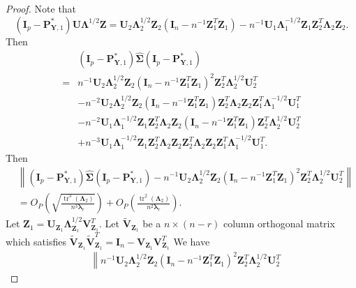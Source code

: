 \documentclass[12pt]{article} %
\DeclareMathOperator{\mytr}{tr}
\newcommand{\bZ}{\mathbf{Z}}
\newcommand{\bP}{\mathbf{P}}
\newcommand{\bY}{\mathbf{Y}}
\newcommand{\bI}{\mathbf{I}}
\newcommand{\bU}{\mathbf{U}}
\newcommand{\bV}{\mathbf{V}}
\newcommand{\bfsym}[1]{\ensuremath{\boldsymbol{#1}}}
\def\blambda {\bfsym {\lambda}}
\def\bLambda {\bfsym {\Lambda}}
\def\bSigma {\bfsym {\Sigma}}
\theoremstyle{definition}
\begin{document}
\begin{appendices}
\begin{proof}
    Note that 
    \begin{equation*}
        (\bI_p-\bP^*_{\bY,1}) \bU \bLambda^{1/2} \bZ
        = \bU_2 \bLambda_2^{1/2} \bZ_2 (\bI_n -n^{-1} \bZ_1^T \bZ_1)-n^{-1} \bU_1 \bLambda_1^{-1/2} \bZ_1 \bZ_2^T \bLambda_2 \bZ_2.
    \end{equation*}
    Then
    \begin{equation*}
        \begin{split}
             &(\bI_p-\bP^*_{\bY,1})\hat{\bSigma}(\bI_p-\bP^*_{\bY,1})
             \\
             =
             &n^{-1}\bU_2 \bLambda_2^{1/2} \bZ_2 (\bI_n -n^{-1} \bZ_1^T \bZ_1)^{2} \bZ_2^T \bLambda_2^{1/2} \bU_2^T
             \\
             &-
             n^{-2} \bU_2 \bLambda_2^{1/2} \bZ_2 (\bI_n -n^{-1} \bZ_1^T \bZ_1)
             \bZ_2^T \bLambda_2 \bZ_2 \bZ_1^T \bLambda_1^{-1/2} \bU_1^T
             \\
             &-
             n^{-2} \bU_1 \bLambda_1^{-1/2} \bZ_1 \bZ_2^T \bLambda_2 \bZ_2(\bI_n -n^{-1} \bZ_1^T \bZ_1) \bZ_2^T \bLambda_2^{1/2} \bU_2^T
             \\
             &+
             n^{-3}
\bU_1 \bLambda_1^{-1/2} \bZ_1 \bZ_2^T \bLambda_2 \bZ_2 \bZ_2^T \bLambda_2 \bZ_2 \bZ_1^T \bLambda_1^{-1/2} \bU_1^T
.
        \end{split}
    \end{equation*}
    Then
    \begin{equation*}
        \begin{split}
             &\left\|
             (\bI_p-\bP^*_{\bY,1})\hat{\bSigma}(\bI_p-\bP^*_{\bY,1})
             -n^{-1}\bU_2 \bLambda_2^{1/2} \bZ_2 (\bI_n -n^{-1} \bZ_1^T \bZ_1)^{2} \bZ_2^T \bLambda_2^{1/2} \bU_2^T
             \right\|
             \\
             &=O_P\left(\sqrt{\frac{\mytr^{3}(\bLambda_2)}{n^{3}\blambda_r}}\right)
             +O_P\left( \frac{\mytr^2 (\bLambda_2)}{n^2\blambda_r}\right).
        \end{split}
    \end{equation*}
    Let $\bZ_1=\bU_{\bZ_1}\bLambda_{\bZ_1}^{1/2}\bV_{\bZ_1}^T$.
    Let $\tilde{\bV}_{\bZ_1}$ be a $n\times (n-r)$ column orthogonal matrix which satisfies $\tilde{\bV}_{\bZ_1}\tilde{\bV}_{\bZ_1}^T= \bI_{n}-\bV_{\bZ_1}\bV_{\bZ_1}^T$
    We have
    \begin{equation*}
        \begin{split}
             &\left\|
             n^{-1}\bU_2 \bLambda_2^{1/2} \bZ_2 (\bI_n -n^{-1} \bZ_1^T \bZ_1)^{2} \bZ_2^T \bLambda_2^{1/2} \bU_2^T

\end{split}
\end{equation*}
\end{proof}
\end{appendices}
\end{document}
